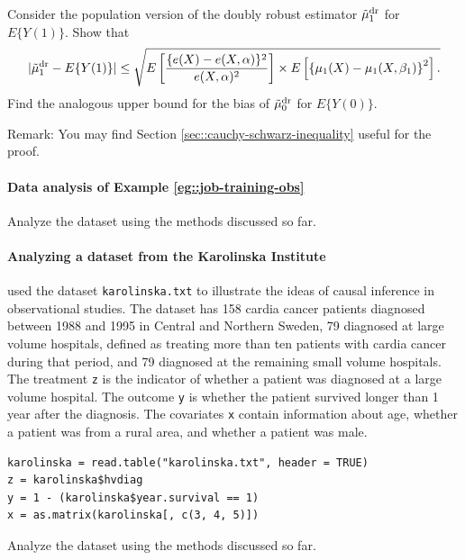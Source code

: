 Consider the population version of the doubly robust estimator $\tilde{\mu}_1^\textup{dr} $ for $E\{  Y(1) \} $. 
Show that
$$
 |   \tilde{\mu}_1^\textup{dr} - E\{  Y(1) \}  |  \leq
\sqrt{
E\left[   \frac{ \{  e(X) - e(X,\alpha)\}^2  }{  e(X,\alpha)^2 }  \right] \times 
E\left[  \left\{  \mu_1(X) -  \mu_1(X, \beta_1)   \right\}^2 \right] .
}
$$
Find the analogous upper bound for the bias of $\tilde{\mu}_0^\textup{dr} $ for $E\{  Y(0) \} $. 


Remark: You may find Section \ref{sec::cauchy-schwarz-inequality} useful for the proof. 


\paragraph{Data analysis of Example \ref{eg::job-training-obs}}


Analyze the dataset  using the methods discussed so far. 

 
 
\paragraph{Analyzing a dataset from the Karolinska Institute}\label{hw::Karolinska-dr}
 
 \citet{rubin2008objective} used the dataset \texttt{karolinska.txt} to illustrate the ideas of causal inference in observational studies. 
 The dataset has 158 cardia cancer patients diagnosed between 1988 and 1995 in Central and Northern Sweden, 79 diagnosed at large volume hospitals, defined as treating more than ten patients with cardia cancer during that period, and 79 diagnosed at the remaining small volume hospitals. The treatment \texttt{z}  is the indicator of whether a patient was diagnosed at a large volume hospital. The outcome \texttt{y} is whether the patient survived longer than 1 year after the diagnosis. The covariates \texttt{x} contain information about age, whether a patient was from a rural area, and whether a patient was male. 
 
\begin{lstlisting}
karolinska = read.table("karolinska.txt", header = TRUE)
z = karolinska$hvdiag
y = 1 - (karolinska$year.survival == 1)
x = as.matrix(karolinska[, c(3, 4, 5)])
\end{lstlisting}


Analyze the dataset using the methods discussed so far. 



  
 


